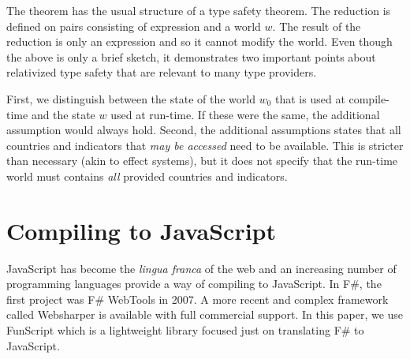 \documentclass[submission,copyright,creativecommons]{eptcs}
\begin{document}
\noindent
The theorem has the usual structure of a type safety theorem. The reduction is defined on pairs
consisting of expression and a world $w$. The result of the reduction is only an expression and
so it cannot modify the world. Even though the above is only a brief sketch, it demonstrates two
important points about relativized type safety that are relevant to many type providers.

First, we distinguish between the state of the world $w_0$ that is used at compile-time and the
state $w$ used at run-time. If these were the same, the additional assumption would always hold.
Second, the additional assumptions states that all countries and indicators that \emph{may be
accessed} need to be available. This is stricter than necessary (akin to effect systems),
but it does not specify that the run-time world must contains \emph{all} provided countries
and indicators.


%
%

\section{Compiling to JavaScript}
\label{sec:js}

JavaScript has become the \emph{lingua franca} of the web and an increasing number of programming
languages provide a way of compiling to JavaScript. In F\#, the first project was F\# WebTools
\cite{fsharp-webtools} in 2007. A more recent and complex framework called Websharper \cite{websharper-guis}
is available with full commercial support. In this paper, we use FunScript which is a lightweight
library focused just on translating F\# to JavaScript.
\end{document}
